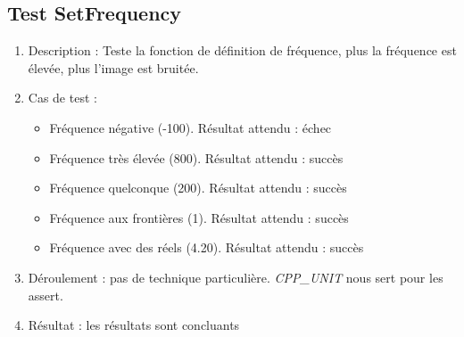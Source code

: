 \documentclass[12pt]{report}
\begin{document}
\subsection{Test SetFrequency}
\begin{enumerate}
    \item Description : Teste la fonction de définition de fréquence, plus la fréquence est élevée, plus l'image est bruitée.
    \item Cas de test :
    \begin{itemize}
        \item Fréquence négative (-100). Résultat attendu : échec
        \item Fréquence très élevée (800). Résultat attendu : succès
        \item Fréquence quelconque (200). Résultat attendu : succès
        \item Fréquence aux frontières (1). Résultat attendu : succès
        \item Fréquence avec des réels (4.20). Résultat attendu : succès
    \end{itemize}
    \item Déroulement : pas de technique particulière. \emph{CPP\_UNIT} nous sert pour les assert.
    \item Résultat : les résultats sont concluants
\end{enumerate}
\end{document}
